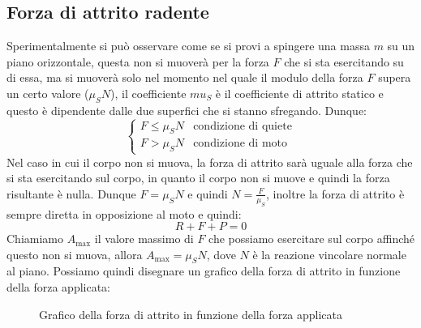     \subsection{Forza di attrito radente}
        Sperimentalmente si può osservare come se si provi a spingere una massa $m$ su un piano orizzontale, questa non si muoverà per la forza $F$ che si sta esercitando su di essa, ma si muoverà solo nel momento nel quale il modulo della forza $F$ supera un certo valore ($\mu_S N$), il coefficiente $mu_S$ è il coefficiente di attrito statico e questo è dipendente dalle due superfici che si stanno sfregando. Dunque:
        $$
            \begin{cases}
                F\leq \mu_S N & \text{condizione di quiete} \\
                F > \mu_S N & \text{condizione di moto}
            \end{cases}
        $$
        Nel caso in cui il corpo non si muova, la forza di attrito sarà uguale alla forza che si sta esercitando sul corpo, in quanto il corpo non si muove e quindi la forza risultante è nulla. Dunque $F = \mu_S N$ e quindi $N = \frac{F}{\mu_S}$, inoltre la forza di attrito è sempre diretta in opposizione al moto e quindi:
        $$
            R + F + P = 0
        $$
        Chiamiamo $A_{\text{max}}$ il valore massimo di $F$ che possiamo esercitare sul corpo affinché questo non si muova, allora $A_{\text{max}} = \mu_S N$, dove $N$ è la reazione vincolare normale al piano.
        Possiamo quindi disegnare un grafico della forza di attrito in funzione della forza applicata:
        \begin{figure}[H]
            \centering
            \caption{Grafico della forza di attrito in funzione della forza applicata}
            \label{fig:attritoStatico}
        \end{figure}
